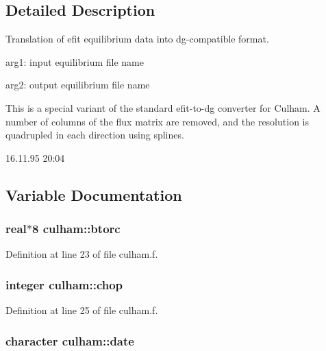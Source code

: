 \subsection{Detailed Description}
Translation of efit equilibrium data into dg-compatible format. 

arg1: input equilibrium file name

arg2: output equilibrium file name

This is a special variant of the standard efit-to-dg converter for Culham. A number of columns of the flux matrix are removed, and the resolution is quadrupled in each direction using splines.

\begin{Desc}
\item[Version:]16.11.95 20:04 \end{Desc}


\subsection{Variable Documentation}
\hypertarget{namespaceculham_d9d2dc032faaf706475d267fde4cbd90}{
\subsubsection[btorc]{\setlength{\rightskip}{0pt plus 5cm}real$\ast$8 {\bf culham::btorc}}}
\label{namespaceculham_d9d2dc032faaf706475d267fde4cbd90}




Definition at line 23 of file culham.f.\hypertarget{namespaceculham_cf77cb461114f1c1ef92e565a814b1ae}{
\subsubsection[chop]{\setlength{\rightskip}{0pt plus 5cm}integer {\bf culham::chop}}}
\label{namespaceculham_cf77cb461114f1c1ef92e565a814b1ae}




Definition at line 25 of file culham.f.\hypertarget{namespaceculham_851b9b19eaa7d3a62c22962b9f86597d}{
\subsubsection[date]{\setlength{\rightskip}{0pt plus 5cm}character {\bf culham::date}}}
\label{namespaceculham_851b9b19eaa7d3a62c22962b9f86597d}




